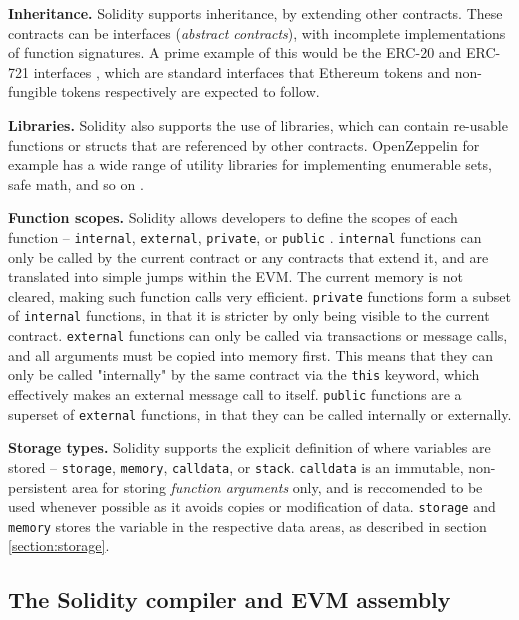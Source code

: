 \textbf{Inheritance.} Solidity supports inheritance, by extending other contracts. These contracts can be interfaces (\textit{abstract contracts}),
with incomplete implementations of function signatures. A prime example of this would be the ERC-20
and ERC-721 interfaces \cite{etherc20} \cite{etherc721}, which are standard interfaces that Ethereum 
tokens and non-fungible tokens respectively are expected to follow. 

\textbf{Libraries.} Solidity also supports the
use of libraries, which can contain re-usable functions or structs that are referenced by other
contracts. OpenZeppelin for example has a wide range of utility libraries for implementing enumerable sets,
safe math, and so on \cite{openzeppelincontracts}.

\textbf{Function scopes.} Solidity allows developers to define the scopes of each function --
\texttt{internal}, \texttt{external}, \texttt{private}, or \texttt{public} \cite{soliditydocsscope}. 
\texttt{internal} functions can only be called by the current contract or any contracts that
extend it, and are translated into simple jumps within the EVM. The current memory is not cleared,
making such function calls very efficient. \texttt{private} functions form a subset of
\texttt{internal} functions, in that it is stricter by only being visible to the current contract.
\texttt{external} functions can only be called via transactions or message calls,
and all arguments must be copied into memory first. This means that they can only be called
"internally" by the same contract via the \texttt{this} keyword, which effectively makes an 
external message call to itself. \texttt{public} functions are a superset of \texttt{external} functions,
in that they can be called internally or externally.

\textbf{Storage types.} Solidity supports the explicit definition of where variables are stored -- 
\texttt{storage}, \texttt{memory}, \texttt{calldata}, or \texttt{stack}. \texttt{calldata} is
an immutable, non-persistent area for storing \textit{function arguments} only, and is
reccomended to be used whenever possible as it avoids copies or modification of data.
\texttt{storage} and \texttt{memory} stores the variable in the respective data areas, 
as described in section \ref{section:storage}. 


\subsection{The Solidity compiler and EVM assembly}

